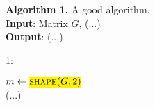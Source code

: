\algruletop{}
\textbf{Algorithm 1.} A good algorithm. \\
\textbf{Input}: Matrix $G$, (...) \\
\textbf{Output}: (...) \\
\begin{scriptsize}
    1:
\end{scriptsize}
$m \gets \highlightpartmath{\textsc{shape}(G,2)}$ \\
(...) \\
\algrulebottom{}